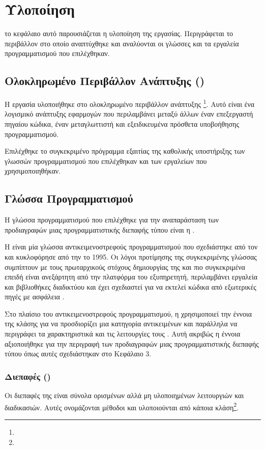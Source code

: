 \chapter{Υλοποίηση}
το κεφάλαιο αυτό παρουσιάζεται η υλοποίηση της εργασίας. 
Περιγράφεται το περιβάλλον στο οποίο αναπτύχθηκε και
αναλύονται οι γλώσσες και τα εργαλεία προγραμματισμού που επιλέχθηκαν.

\section{Ολοκληρωμένο Περιβάλλον Ανάπτυξης ()}
Η εργασία υλοποιήθηκε στο ολοκληρωμένο περιβάλλον ανάπτυξης \footnote{}.
Αυτό είναι ένα λογισμικό ανάπτυξης εφαρμογών που περιλαμβάνει μεταξύ άλλων έναν επεξεργαστή πηγαίου κώδικα,
έναν μεταγλωττιστή και εξειδικευμένα πρόσθετα υποβοήθησης προγραμματισμού. 

Επιλέχθηκε το συγκεκριμένο πρόγραμμα εξαιτίας της καθολικής υποστήριξης των γλωσσών προγραμματισμού που επιλέχθηκαν
και των εργαλείων που χρησιμοποιηθήκαν.

\section{Γλώσσα Προγραμματισμού}
Η γλώσσα προγραμματισμού που επιλέχθηκε για την αναπαράσταση των προδιαγραφών μιας προγραμματιστικής διεπαφής τύπου  είναι η .

Η  είναι μία γλώσσα αντικειμενοστρεφούς προγραμματισμού 
που σχεδιάστηκε από τον  και κυκλοφόρησε από την  το 1995.
Οι λόγοι προτίμησης της συγκεκριμένης γλώσσας συμπίπτουν με τους πρωταρχικούς στόχους δημιουργίας της 
και πιο συγκεκριμένα επειδή είναι ανεξάρτητη από την πλατφόρμα του εξυπηρετητή, 
περιλαμβάνει εργαλεία και βιβλιοθήκες διαδικτύου
και έχει σχεδιαστεί για να εκτελεί κώδικα από εξωτερικές πηγές με ασφάλεια \cite{gosling1995java}.

Στο πλαίσιο του αντικειμενοστρεφούς προγραμματισμού,
η  χρησιμοποιεί την έννοια της κλάσης
για να προσδιορίζει μια κατηγορία αντικειμένων
και παράλληλα να περιγράφει τα χαρακτηριστικά και τις λειτουργίες τους \cite{arnold2000java}.
Αυτή ακριβώς η έννοια αξιοποιήθηκε για την περιγραφή των προδιαγραφών μιας προγραμματιστικής διεπαφής τύπου 
όπως αυτές σχεδιάστηκαν στο Κεφάλαιο 3.

\subsection{Διεπαφές ()}
Οι διεπαφές της  είναι σύνολα ορισμένων αλλά μη υλοποιημένων λειτουργιών και διαδικασιών.
Αυτές ονομάζονται μέθοδοι και υλοποιούνται από κάποια κλάση\footnote{}.

